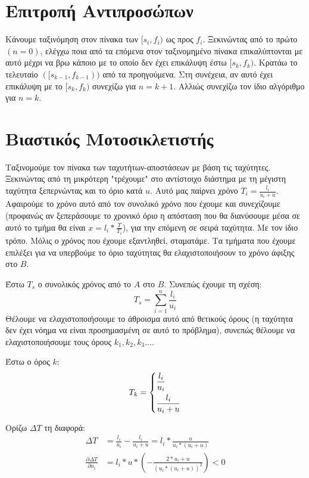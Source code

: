 \documentclass[a4paper,10pt]{article} \usepackage{anysize}
\begin{document}
\def\thesubsection {\alph{subsection}}
\renewcommand{\labelenumi}{\roman{enumi})}
\renewcommand{\labelenumii}{(\arabic{enumii})}




\section{Επιτροπή Αντιπροσώπων} \setcounter{section}{1}
Κάνουμε ταξινόμηση στον πίνακα των $[s_i,f_i)$ ως προς $f_i$. Ξεκινώντας από
 το πρώτο $(n=0)$, ελέγχω ποια από τα επόμενα στον ταξινομημένο πίνακα επικαλύπτονται
με αυτό μέχρι να βρω κάποιο με το οποίο δεν έχει επικάλυψη έστω $[s_k,f_k)$. Κρατάω
το τελευταίο $([s_{k-1},f_{k-1}))$ από τα προηγούμενα. Στη συνέχεια, αν αυτό έχει
επικάλυψη με το $[s_k,f_k)$ συνεχίζω για $n=k+1$. Αλλιώς συνεχίζω
τον ίδιο αλγόριθμο για $n=k$.


\section{Βιαστικός Μοτοσικλετιστής}
Ταξινομούμε τον πίνακα των ταχυτήτων-αποστάσεων με βάση τις ταχύτητες.
Ξεκινώντας από τη μικρότερη "τρέχουμε" στο αντίστοιχο διάστημα με τη μέγιστη
ταχύτητα ξεπερνώντας και το όριο κατά $u$. Αυτό μας παίρνει χρόνο
$T_i=\frac{l_i}{u_i+u}$. Αφαιρούμε το χρόνο αυτό από τον συνολικό χρόνο που
έχουμε και συνεχίζουμε (προφανώς αν ξεπεράσουμε το χρονικό όριο η απόσταση που
θα διανύσουμε μέσα σε αυτό το τμήμα θα είναι $x=l_i*\frac{T}{T_i}$), για την
επόμενη σε σειρά ταχύτητα. Με τον ίδιο τρόπο. Μόλις ο χρόνος που έχουμε
εξαντληθεί, σταματάμε. Τα τμήματα που έχουμε επιλέξει για να υπερβούμε το όριο
ταχύτητας θα ελαχιστοποιήσουν το χρόνο άφιξης στο $B$.

Έστω $T_s$ ο συνολικός χρόνος από το $A$ στο $B$. Συνεπώς έχουμε τη σχέση:
\[
T_s=\sum_{i=1}^n{\frac{l_i}{u_i}}
\]
Θέλουμε να ελαχιστοποιήσουμε το άθροισμα αυτό από θετικούς όρους (η ταχύτητα
δεν έχει νόημα να είναι προσημασμένη σε αυτό το πρόβλημα), συνεπώς θέλουμε να
ελαχιστοποιήσουμε τους όρους $k_1, k_2, k_3 ...$.

Έστω ο όρος $k$:
\[
T_k=
	\begin{dcases}
	\frac{l_i}{u_i} \\
	\frac{l_i}{u_i+u}  
	\end{dcases}
\]

Ορίζω $\Delta{T}$ τη διαφορά:
\begin{align*}
	\Delta{T}&=\frac{l_i}{u_i} - \frac{l_i}{u_i+u} =
	l_i*\frac{u}{u_i*(u_i+u)}\\
	\frac{\partial{\Delta{T}}}{\partial{u_i}} &=
	l_i*u*(-\frac{2*u_i+u}{(u_i*(u_i+u))^2}) < 0
\end{align*}
\end{document}
